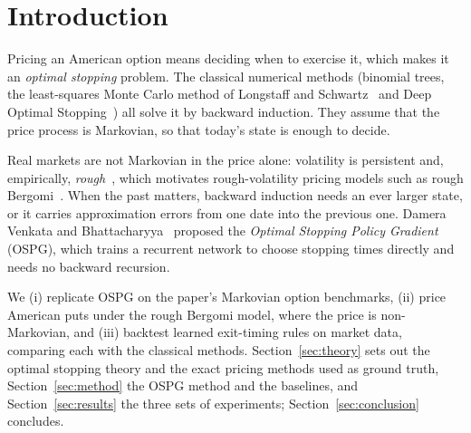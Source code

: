 \section{Introduction}

Pricing an American option means deciding when to exercise it, which makes it an
\emph{optimal stopping} problem. The classical numerical methods (binomial trees,
the least-squares Monte Carlo method of Longstaff and Schwartz~\cite{ls2001} and Deep
Optimal Stopping~\cite{becker2019}) all solve it by backward induction. They assume that
the price process is Markovian, so that today's state is enough to decide.

Real markets are not Markovian in the price alone: volatility is persistent and,
empirically, \emph{rough}~\cite{gjr2018}, which motivates rough-volatility pricing models
such as rough Bergomi~\cite{bfg2016}. When the past matters, backward induction needs
an ever larger state, or it carries approximation errors from one date into the
previous one. Damera Venkata and Bhattacharyya~\cite{ospg2023} proposed the
\emph{Optimal Stopping Policy Gradient} (OSPG), which trains a recurrent network to
choose stopping times directly and needs no backward recursion.

We (i) replicate OSPG on the paper's Markovian option benchmarks, (ii) price American
puts under the rough Bergomi model, where the price is non-Markovian, and (iii) backtest
learned exit-timing rules on market data, comparing each with the classical methods.
Section~\ref{sec:theory} sets out the optimal stopping theory and the exact pricing
methods used as ground truth, Section~\ref{sec:method} the OSPG method and the baselines,
and Section~\ref{sec:results} the three sets of experiments; Section~\ref{sec:conclusion}
concludes.
